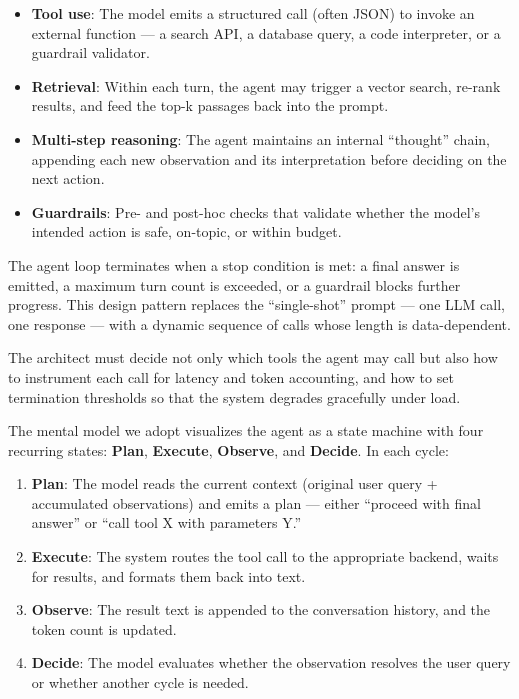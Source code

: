 \begin{itemize}
\tightlist
\item
  \textbf{Tool use}: The model emits a structured call (often JSON) to
  invoke an external function --- a search API, a database query, a code
  interpreter, or a guardrail validator.
\item
  \textbf{Retrieval}: Within each turn, the agent may trigger a vector
  search, re-rank results, and feed the top-k passages back into the
  prompt.
\item
  \textbf{Multi-step reasoning}: The agent maintains an internal
  ``thought'' chain, appending each new observation and its
  interpretation before deciding on the next action.
\item
  \textbf{Guardrails}: Pre- and post-hoc checks that validate whether
  the model's intended action is safe, on-topic, or within budget.
\end{itemize}

The agent loop terminates when a stop condition is met: a final answer
is emitted, a maximum turn count is exceeded, or a guardrail blocks
further progress. This design pattern replaces the ``single-shot''
prompt --- one LLM call, one response --- with a dynamic sequence of
calls whose length is data-dependent.

The architect must decide not only which tools the agent may call but
also how to instrument each call for latency and token accounting, and
how to set termination thresholds so that the system degrades gracefully
under load.

\label{mental-model}


The mental model we adopt visualizes the agent as a state machine with
four recurring states: \textbf{Plan}, \textbf{Execute},
\textbf{Observe}, and \textbf{Decide}. In each cycle:

\begin{enumerate}
\def\labelenumi{\arabic{enumi}.}
\tightlist
\item
  \textbf{Plan}: The model reads the current context (original user
  query + accumulated observations) and emits a plan --- either
  ``proceed with final answer'' or ``call tool X with parameters Y.''
\item
  \textbf{Execute}: The system routes the tool call to the appropriate
  backend, waits for results, and formats them back into text.
\item
  \textbf{Observe}: The result text is appended to the conversation
  history, and the token count is updated.
\item
  \textbf{Decide}: The model evaluates whether the observation resolves
  the user query or whether another cycle is needed.
\end{enumerate}

